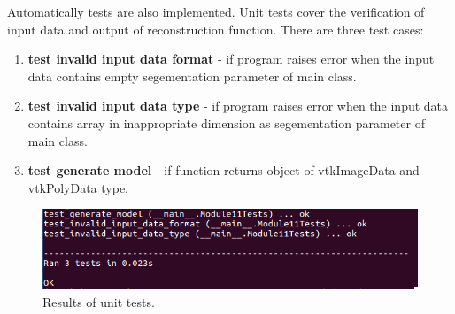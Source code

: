 \indent Automatically tests are also implemented. Unit tests cover the verification of  input data and output of reconstruction function. There are three test cases:
\begin{enumerate}
\item \textbf{test invalid input data format} - if program raises error when the input data contains empty segementation parameter of main class. 
\item \textbf{test invalid input data type} - if program raises error when the input data contains array in inappropriate dimension as segementation parameter of main class.
\item \textbf{test generate model} - if function returns object of vtkImageData and vtkPolyData type.
\end{enumerate}
\begin{figure}[H]
\centering{}\includegraphics[scale=0.7]{figures/Module_11/11_unit_test.png}\caption{Results of unit tests. \label{fig:figures/11_unit_test}}
\end{figure}




